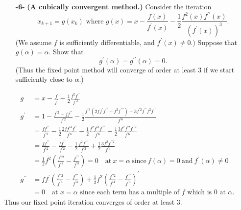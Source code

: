 \documentclass[11pt]{article}
\theoremstyle{definition}
\newcommand{\1}[1]{\mathbf{1} \left \{ #1 \right \}}
\begin{document}
\begin{itemize}
    \item[{\textbf{-6-}}] \textbf{(A cubically convergent method.)}  Consider the iteration
    \begin{equation*}
        x_{k+1} = g(x_k) \text{  where  } g(x) = x - \frac{f(x)}{f^{\prime}(x)} - \frac{1}{2}\frac{f^2 (x) f^{\prime\prime}(x)}{\left(f^{\prime}(x)\right)^3}.
    \end{equation*}
    (We assume $f$ is sufficiently differentiable, and $f^{\prime}(x) \neq 0$.)  Suppose that $g(\alpha) = \alpha$.  Show that
    \[g^{\prime}(\alpha) = g^{\prime\prime}(\alpha) = 0.\]
    (Thus the fixed point method will converge of order at least $3$ if we start sufficiently close to $\alpha$.)
\end{itemize}
\begin{equation*}
    \begin{split}
        g &= x - \frac{f}{f^{\prime}} - \frac{1}{2} \frac{f^2 f^{\prime\prime}}{f^{\prime 3}} \\
        g^{\prime} &= 1 - \frac{f^{\prime 2} - f f^{\prime\prime}}{f^{\prime 2}} - \frac{1}{2} \frac{f^{\prime 3} (2 f f^{\prime} f^{\prime\prime} + f^2 f^{\prime\prime\prime}) - 3 f^{\prime 2} f^{\prime\prime} f^2 f^{\prime\prime}}{f^{\prime 6}} \\
        &= \frac{f f^{\prime\prime}}{f^{\prime2}} - \frac{1}{2} \frac{2ff^{\prime4}f^{\prime\prime}}{f^{\prime 6}} - \frac{1}{2} \frac{f^2 f^{\prime3} f^{\prime\prime\prime}}{f^{\prime 6}} + \frac{1}{2} \frac{3f^2 f^{\prime2} f^{\prime\prime2}}{f^{\prime 6}} \\
        &= \frac{f f^{\prime\prime}}{f^{\prime2}} - \frac{f f^{\prime\prime}}{f^{\prime 2}} - \frac{1}{2} \frac{f^2 f^{\prime\prime\prime}}{f^{\prime 3}} + \frac{1}{2} \frac{3 f^2 f^{\prime\prime2}}{f^{\prime 4}} \\
        &= \frac{1}{2} f^2 \left(\frac{f^{\prime\prime2}}{f^{\prime4}} - \frac{f^{\prime\prime\prime}}{f^{\prime3}}\right) = 0 \quad \text{at} \ x = \alpha \ \text{since} \ f(\alpha) = 0 \ \text{and} \ f^{\prime}(\alpha) \neq 0 \\
        g^{\prime\prime} &= f f^{\prime} \left(\frac{f^{\prime\prime2}}{f^{\prime4}} - \frac{f^{\prime\prime\prime}}{f^{\prime3}}\right) + \frac{1}{2}f^2 \left(\frac{f^{\prime\prime2}}{f^{\prime4}} - \frac{f^{\prime\prime\prime}}{f^{\prime3}}\right)^{\prime} \\
        &= 0 \quad \text{at $x=\alpha$ since each term has a multiple of $f$ which is $0$ at } \alpha.
    \end{split}
\end{equation*}
Thus our fixed point iteration converges of order at least $3$.
\end{document}
